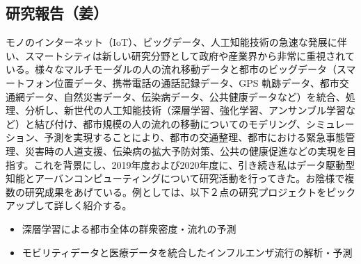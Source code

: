 \subsection{研究報告（姜）}
モノのインターネット（IoT）、ビッグデータ、人工知能技術の急速な発展に伴い、スマートシティは新しい研究分野として政府や産業界から非常に重視されている。様々なマルチモーダルの人の流れ移動データと都市のビッグデータ（スマートフォン位置データ、携帯電話の通話記録データ、GPS 軌跡データ、都市交通網データ、自然災害データ、伝染病データ、公共健康データなど）を統合、処理、分析し、新世代の人工知能技術（深層学習、強化学習、アンサンブル学習など）と結び付け、都市規模の人の流れの移動についてのモデリング、シミュレーション、予測を実現することにより、都市の交通整理、都市における緊急事態管理、災害時の人道支援、伝染病の拡大予防対策、公共の健康促進などの実現を目指す。これを背景にし、2019年度および2020年度に、引き続き私はデータ駆動型知能とアーバンコンピューティングについて研究活動を行ってきた。お陰様で複数の研究成果\cite{JIANG1901}をあげている。例としては、以下２点の研究プロジェクトをピックアップして詳しく紹介する。

\begin{itemize}
    \item 深層学習による都市全体の群衆密度・流れの予測
    \item モビリティデータと医療データを統合したインフルエンザ流行の解析・予測
\end{itemize}

